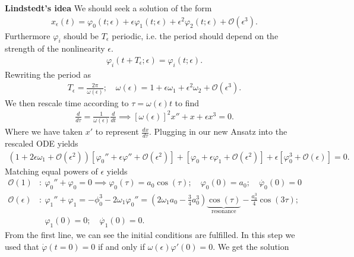 \begin{ex}
\noindent
\textbf{Lindstedt's idea} We should seek a solution of the form
\begin{align}
	x_{\epsilon}(t) = \varphi_0(t;\epsilon) + \epsilon \varphi_1 (t;\epsilon) + \epsilon^2 \varphi_2(t;\epsilon) + \mathcal{O}(\epsilon^3).
\end{align}
Furthermore $\varphi_i$ should be $T_\epsilon$ periodic, i.e. the period should depend on the strength of the  nonlinearity $\epsilon$.
\begin{align}
	\varphi_i(t+T_\epsilon; \epsilon) = \varphi_i(t;\epsilon).
\end{align}
Rewriting the period as
\begin{align}
	T_\epsilon = \frac{2 \pi }{\omega(\epsilon)}; \quad \omega(\epsilon) = 1 + \epsilon \omega_1 + \epsilon^2 \omega_2 + \mathcal{O}(\epsilon^3).
\end{align}
We then rescale time according to $\tau = \omega(\epsilon) t$ to find
\begin{align}
	\frac{d}{d\tau} = \frac{1}{\omega(\epsilon)} \frac{d}{dt} \implies 
	\boxed{[\omega(\epsilon)]^2 x'' + x + \epsilon x^3 = 0.}
\end{align}
Where we have taken $x'$ to represent $\frac{dx}{d\tau}$. Plugging in our new Ansatz into the rescaled ODE yields
\begin{align}
	\left( 1 + 2 \epsilon \omega_1 + \mathcal{O}(\epsilon^2) \right) \left[ \varphi_0'' + \epsilon \varphi'' + \mathcal{O}(\epsilon^2) \right] + \left[ \varphi_0 + \epsilon \varphi_1 + \mathcal{O}(\epsilon^2) \right] + \epsilon \left[\varphi_0^{3} + \mathcal{O}(\epsilon) \right] = 0.
\end{align}
Matching equal powers of $\epsilon$ yields
\begin{align}
	\mathcal{O}(1)&:\ \varphi_0'' + \varphi_0 = 0 \implies \varphi_0(\tau) = a_0 \cos(\tau);\quad \varphi_0(0)=a_0;\quad \dot{\varphi_0}(0) = 0 \\
	\mathcal{O}(\epsilon)&:\ \varphi_1'' + \varphi_1 = - \phi_0^{3} - 2\omega_1 \varphi_{0}'' = 
	\left(2 \omega_1 a_0 - \frac{3}{4}a_0^{3}\right) \underbrace{\cos (\tau)}_{ \textrm{resonance} } - \frac{a_0^{3}}{4} \cos(3 \tau); \\
			     &\phantom{:}\ \varphi_1(0)=0; \quad \dot{\varphi_1}(0) = 0. 
\end{align}
From the first line, we can see the initial conditions are fulfilled. In this step we used that $\dot{\varphi}(t=0) = 0$ if and only if $\omega(\epsilon)\varphi '(0) = 0$. We get the solution
\begin{align}

\end{align}
\end{ex}
